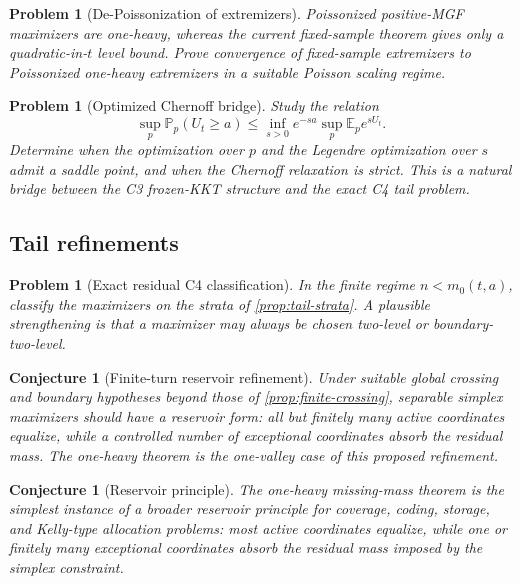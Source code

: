 \documentclass[11pt]{article}
\theoremstyle{plain}
\newtheorem{conjecture}[theorem]{Conjecture}
\newtheorem{problem}[theorem]{Problem}
\theoremstyle{definition}
\theoremstyle{remark}
\newcommand{\E}{\mathbb E}
\newcommand{\PP}{\mathbb P}
\begin{document}
\begin{problem}[De-Poissonization of extremizers]
Poissonized positive-MGF maximizers are one-heavy, whereas the current fixed-sample theorem gives only a quadratic-in-\(t\) level bound.  Prove convergence of fixed-sample extremizers to Poissonized one-heavy extremizers in a suitable Poisson scaling regime.
\end{problem}

\begin{problem}[Optimized Chernoff bridge]
Study the relation
\[
\sup_p\PP_p(U_t\ge a)
\le
\inf_{s>0}e^{-sa}\sup_p\E_p e^{sU_t}.
\]
Determine when the optimization over \(p\) and the Legendre optimization over \(s\) admit a saddle point, and when the Chernoff relaxation is strict.  This is a natural bridge between the C3 frozen-KKT structure and the exact C4 tail problem.
\end{problem}

\subsection{Tail refinements}

\begin{problem}[Exact residual C4 classification]
In the finite regime \(n<m_0(t,a)\), classify the maximizers on the strata of \cref{prop:tail-strata}.  A plausible strengthening is that a maximizer may always be chosen two-level or boundary-two-level.
\end{problem}

\begin{conjecture}[Finite-turn reservoir refinement]
Under suitable global crossing and boundary hypotheses beyond those of \cref{prop:finite-crossing}, separable simplex maximizers should have a reservoir form: all but finitely many active coordinates equalize, while a controlled number of exceptional coordinates absorb the residual mass.  The one-heavy theorem is the one-valley case of this proposed refinement.
\end{conjecture}

\begin{conjecture}[Reservoir principle]
The one-heavy missing-mass theorem is the simplest instance of a broader reservoir principle for coverage, coding, storage, and Kelly-type allocation problems: most active coordinates equalize, while one or finitely many exceptional coordinates absorb the residual mass imposed by the simplex constraint.
\end{conjecture}
\end{document}
